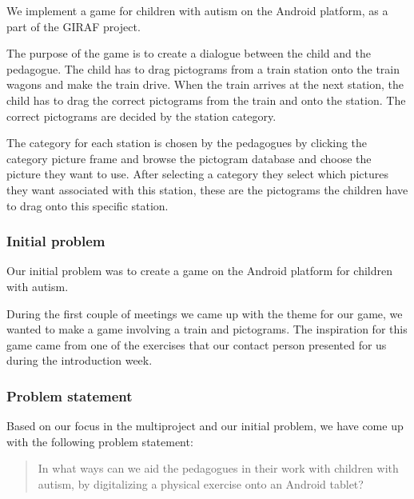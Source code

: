 We implement a game for children with autism on the Android platform, as a part of the GIRAF project.

The purpose of the game is to create a dialogue between the child and the pedagogue. The child has to drag pictograms from a train station onto the train wagons and make the train drive. When the train arrives at the next station, the child has to drag the correct pictograms from the train and onto the station. The correct pictograms are decided by the station category.

The category for each station is chosen by the pedagogues by clicking the category picture frame and browse the pictogram database and choose the picture they want to use. After selecting a category they select which pictures they want associated with this station, these are the pictograms the children have to drag onto this specific station.

\subsubsection*{Initial problem}

Our initial problem was to create a game on the Android platform for children with autism. 

During the first couple of meetings we came up with the theme for our game, we wanted to make a game involving a train and pictograms. The inspiration for this game came from one of the exercises that our contact person presented for us during the introduction week.


\subsubsection*{Problem statement}

Based on our focus in the multiproject and our initial problem, we have come up with the following problem statement:

\begin{quote}
In what ways can we aid the pedagogues in their work with children with autism, by digitalizing a physical exercise onto an Android tablet?
\end{quote}